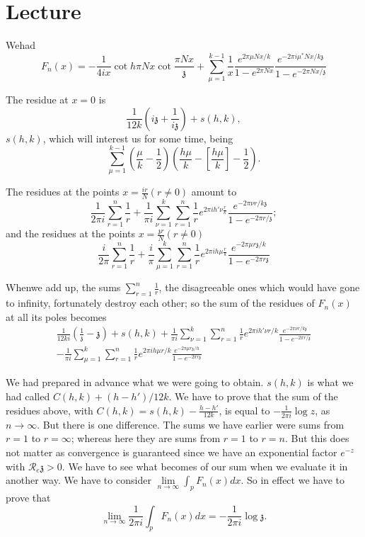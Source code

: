 \chapter{Lecture}\label{part3:lec29} %

We\pageoriginale had
$$
F_n (x) = - \frac{1}{4 i x} \cot h \pi N x \cot \frac{\pi
  Nx}{\mathfrak{z}} + \sum^{k-1}_{\mu=1} \frac{1}{x} \frac{e^{2 \pi
    \mu Nx/k}}{1- e^{2 \pi Nx}} \frac{e^{- 2 \pi i \mu^*
    Nx/k\mathfrak{z}}}{1- e^{-2 \pi Nx/\mathfrak{z}}}
$$

The residue at $x=0$ is 
$$
\frac{1}{12k} \left( i \mathfrak{z} + \frac{1}{i \mathfrak{z}}\right)
+ s(h, k),
$$
$s(h, k)$, which will interest us for some time, being
$$
\sum^{k-1}_{\mu=1} \left( \frac{\mu}{k} - \frac{1}{2}\right)
\left(\frac{h \mu}{k}- \left[ \frac{h \mu}{k}\right]- \frac{1}{2} \right).
$$

The residues at the points $x= \frac{i r}{N} (r \neq 0)$ amount to 
$$
\frac{1}{2 \pi i} \sum^n_{r=1} \frac{1}{r} + \frac{1}{\pi i}
\sum^k_{\nu=1} \sum^n_{r=1} \frac{1}{r} e^{2 \pi i h' \nu \frac{r}{k}}
\frac{e^{-2 \pi \nu r/k\mathfrak{z}}}{1- e^{-2 \pi r/\mathfrak{z}}};
$$ 
and the residues at the points $x= \frac{\mathfrak{z} r}{N} (r \neq
0)$
$$
\frac{i}{2 \pi} \sum^n_{r=1} \frac{1}{r} + \frac{i}{\pi}
\sum^k_{\mu=1} \sum^n_{r=1} \frac{1}{r} e^{2 \pi i h \mu \frac{r}{k}}
\frac{e^{-2 \pi \mu r \mathfrak{z}/k}}{1- e^{-2 \pi r \mathfrak{z}}}
$$

When\pageoriginale we add up, the sums $\sum^n_{r=1} \frac{1}{r}$,
the disagreeable ones which would have gone to infinity, fortunately
destroy each other; so the sum of the residues of $F_n(x)$ at all its
poles becomes
\begin{multline*}
  \frac{1}{12 ki} \left( \frac{1}{\mathfrak{z}} - \mathfrak{z}\right)
  + s(h, k)+ \frac{1}{\pi i} \sum^k_{\nu=1} \sum^n_{r=1} \frac{1}{r}
  e^{2 \pi i h' \nu r/k} \frac{e^{- 2 \pi \nu r/ k \mathfrak{z}}}{1-
    e^{- 2 \pi r/\mathfrak{z}}}\\
  - \frac{1}{\pi i} \sum^k_{\mu =1}
  \sum^n_{r=1} \frac{1}{r} e^{ 2 \pi i h \mu r/k} \frac{e^{-2 \pi \mu
      r \mathfrak{z}/h}}{1- e^{-2 \pi r \mathfrak{z}}}
\end{multline*}

We had prepared in advance what we were going to obtain. $s(h, k)$ is
what we had called $C(h, k)+ (h-h')/12k$. We have to prove that the
sum of the residues above, with $C(h, k)= s(h, k)- \frac{h- h'}{12k}$,
is equal to $- \frac{1}{2 \pi i} \log z$, as $n \to \infty$. But there
is one difference. The sums we have earlier were sums from $r=1$ to
$r= \infty$; whereas here they are sums from $r=1$ to $r=n$. But this
does not matter as convergence is guaranteed since we have an
exponential factor $e^{-z}$ with $\mathcal{R}_e \mathfrak{z} > 0$. We
have to see what becomes of our sum when we evaluate it in another
way. We have to consider $\lim\limits_{n \to \infty} \int_p F_n (x)
dx$. So in effect we have to prove that
$$
\lim\limits_{n \to \infty} \frac{1}{2 \pi i} \int_p F_n (x) dx= -
\frac{1}{2 \pi i} \log \mathfrak{z}.
$$\pageoriginale

